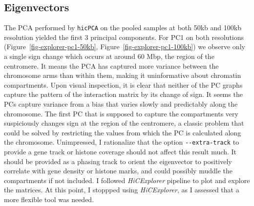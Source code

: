 \documentclass[
  11pt,
  a4paper,
]{scrbook}
\let\origfigure\figure
\let\endorigfigure\endfigure
\renewenvironment{figure}[1][2] {
    \expandafter\origfigure\expandafter[htbp]
} {
    \endorigfigure
}
\begin{document}
\begin{figure}
\begin{minipage}{0.50\linewidth}
{}


\end{minipage}%

\caption{\label{fig-explorer-pooled-norm-normcorr}A comparison of
interaction matrices before/after iterative correction
(\emph{HiCExplorer}).}

\end{figure}%

\subsection{Eigenvectors}\label{eigenvectors}

The PCA performed by \texttt{hicPCA} on the pooled samples at both 50kb
and 100kb resolution yielded the first 3 principal components. For PC1
on both resolutions (Figure~\ref{fig-explorer-pc1-50kb},
Figure~\ref{fig-explorer-pc1-100kb}) we observe only a single sign
change which occurs at around 60 Mbp, the region of the centromere. It
means the PCA has captured more variance between the chromosome arms
than within them, making it uninformative about chromatin compartments.
Upon visual inspection, it is clear that neither of the PC graphs
capture the pattern of the interaction matrix by its change of sign. It
seems the PCs capture variance from a bias that varies slowly and
predictably along the chromosome. The first PC that is supposed to
capture the compartments very suspiciously changes sign at the region of
the centromere, a classic problem that could be solved by restricting
the values from which the PC is calculated along the chromosome.
Unimpressed, I rationalize that the option \texttt{-\/-extra-track} to
provide a gene track or histone coverage should not affect this result
much. It should be provided as a phasing track to orient the eigenvector
to positively correlate with gene density or histone marks, and could
possibly muddle the compartments if not included. I followed
\emph{HiCExplorer} pipeline to plot and explore the matrices. At this
point, I stoppped using \emph{HiCExplorer}, as I assessed that a more
flexible tool was needed.
\end{document}
